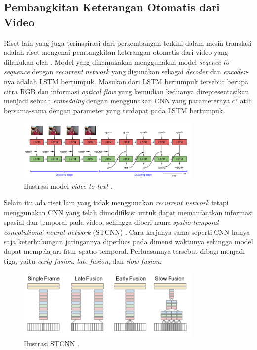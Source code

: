 \subsection{Pembangkitan Keterangan Otomatis dari Video}

Riset lain yang juga terinspirasi dari perkembangan terkini dalam mesin translasi adalah riset mengenai pembangkitan keterangan otomatis dari video yang dilakukan oleh \textcite{Venugopalan2015}. Model yang dikemukakan menggunakan model \textit{seqence-to-sequence} dengan \textit{recurrent network} yang digunakan sebagai \textit{decoder} dan \textit{encoder}-nya adalah LSTM bertumpuk. Masukan dari LSTM bertumpuk tersebut berupa citra RGB dan informasi \textit{optical flow} yang kemudian keduanya direpresentasikan menjadi sebuah \textit{embedding} dengan menggunakan CNN yang parameternya dilatih bersama-sama dengan parameter yang terdapat pada LSTM bertumpuk.
\bigskip

\begin{figure}[h]
    \centering
    \includegraphics[width=0.8\textwidth]{resources/images/video-to-text.png}
    \caption{Ilustrasi model \textit{video-to-text} \parencite{Chung2017}.}
    \label{fig:video-to-text}
\end{figure}

Selain itu ada riset lain yang tidak menggunakan \textit{recurrent network} tetapi menggunakan CNN yang telah dimodifikasi untuk dapat memanfaatkan informasi spasial dan temporal pada video, sehingga diberi nama \textit{spatio-temporal convolutional neural network} (STCNN) \parencite{Karpathy2014}. Cara kerjanya sama seperti CNN hanya saja keterhubungan jaringannya diperluas pada dimensi waktunya sehingga model dapat mempelajari fitur spatio-temporal. Perluasannya tersebut dibagi menjadi tiga, yaitu \textit{early fusion}, \textit{late fusion}, dan \textit{slow fusion}.

\begin{figure}[h]
    \centering
    \includegraphics[width=0.8\textwidth]{resources/images/stcnn.png}
    \caption{Ilustrasi STCNN \parencite{Karpathy2014}.}
    \label{fig:stcnn}
\end{figure}

